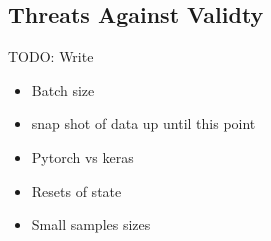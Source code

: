 \subsection{Threats Against Validty}
TODO: Write

\begin{itemize}
  \item Batch size
  \item snap shot of data up until this point
  \item Pytorch vs keras
  \item Resets of state
  \item Small samples sizes
\end{itemize}

